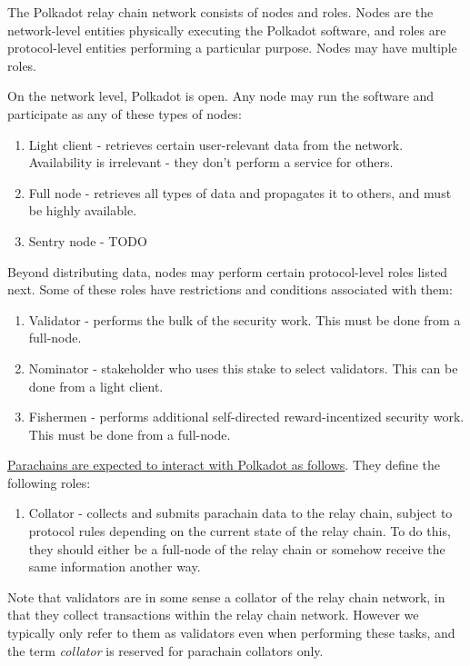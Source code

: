 The Polkadot relay chain network consists of nodes and roles. Nodes are the network-level entities physically executing the Polkadot software, and roles are protocol-level entities performing a particular purpose. Nodes may have multiple roles.

On the network level, Polkadot is open. Any node may run the software and participate as any of these types of nodes:

\begin{enumerate}
\item Light client - retrieves certain user-relevant data from the network. Availability is irrelevant - they don't perform a service for others.
\item Full node - retrieves all types of data and propagates it to others, and must be highly available.
\item Sentry node - TODO
\end{enumerate}

Beyond distributing data, nodes may perform certain protocol-level roles listed next. Some of these roles have restrictions and conditions associated with them:

\begin{enumerate}
\item Validator - performs the bulk of the security work. This must be done from a full-node.
\item Nominator - stakeholder who uses this stake to select validators. This can be done from a light client.
\item Fishermen - performs additional self-directed reward-incentized security work. This must be done from a full-node.
\end{enumerate}

\uline{Parachains are expected to interact with Polkadot as follows}. They define the following roles:

\begin{enumerate}
\item Collator - collects and submits parachain data to the relay chain, subject to protocol rules depending on the current state of the relay chain. To do this, they should either be a full-node of the relay chain or somehow receive the same information another way.
\end{enumerate}

Note that validators are in some sense a collator of the relay chain network, in that they collect transactions within the relay chain network. However we typically only refer to them as validators even when performing these tasks, and the term \emph{collator} is reserved for parachain collators only.

